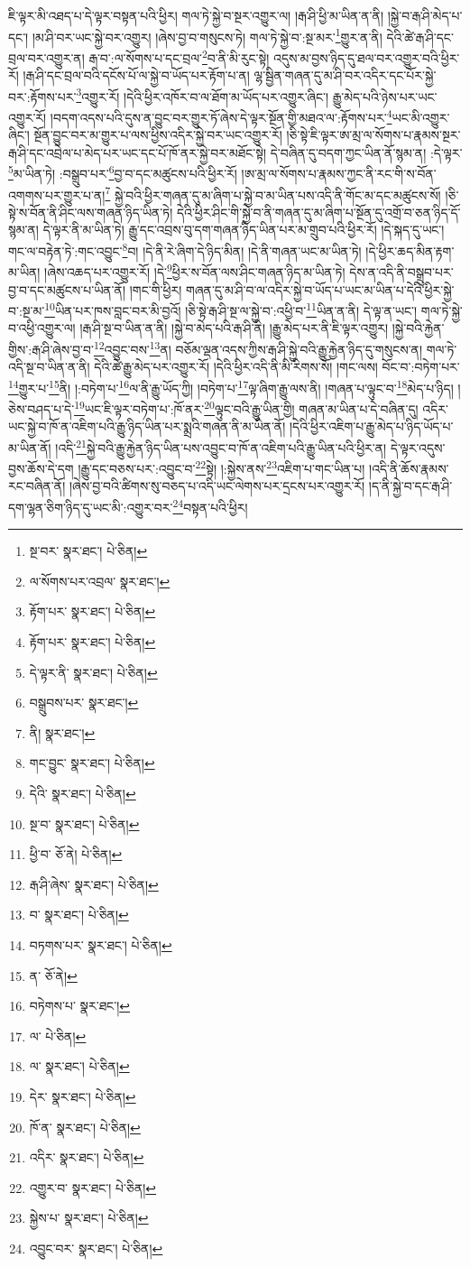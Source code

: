 ཇི་ལྟར་མི་འཐད་པ་དེ་ལྟར་བསྟན་པའི་ཕྱིར། གལ་ཏེ་སྐྱེ་བ་སྔར་འགྱུར་ལ། །རྒ་ཤི་ཕྱི་མ་ཡིན་ན་ནི། །སྐྱེ་བ་རྒ་ཤི་མེད་པ་དང་། །མ་ཤི་བར་ཡང་སྐྱེ་བར་འགྱུར། །ཞེས་བྱ་བ་གསུངས་ཏེ། གལ་ཏེ་སྐྱེ་བ་:སྔ་མར་\footnote{སྔ་བར་  སྣར་ཐང་།  པེ་ཅིན། }གྱུར་ན་ནི། དེའི་ཚེ་རྒ་ཤི་དང་བྲལ་བར་འགྱུར་ན། རྒ་བ་:ལ་སོགས་པ་དང་བྲལ་\footnote{ལ་སོགས་པར་འབྲལ་  སྣར་ཐང་། }བ་ནི་མི་རུང་སྟེ། འདུས་མ་བྱས་ཉིད་དུ་ཐལ་བར་འགྱུར་བའི་ཕྱིར་རོ། །རྒ་ཤི་དང་བྲལ་བའི་དངོས་པོ་ལ་སྐྱེ་བ་ཡོད་པར་རྟོག་པ་ན། ལྷ་སྦྱིན་གཞན་དུ་མ་ཤི་བར་འདིར་དང་པོར་སྐྱེ་བར་:རྟོགས་པར་\footnote{རྟོག་པར་  སྣར་ཐང་།  པེ་ཅིན། }འགྱུར་རོ། །དེའི་ཕྱིར་འཁོར་བ་ལ་ཐོག་མ་ཡོད་པར་འགྱུར་ཞིང་། རྒྱུ་མེད་པའི་ཉེས་པར་ཡང་འགྱུར་རོ། །བདག་འདས་པའི་དུས་ན་བྱུང་བར་གྱུར་ཏོ་ཞེས་དེ་ལྟར་སྔོན་གྱི་མཐའ་ལ་:རྟོགས་པར་\footnote{རྟོག་པར་  སྣར་ཐང་།  པེ་ཅིན། }ཡང་མི་འགྱུར་ཞིང་། སྔོན་བྱུང་བར་མ་གྱུར་པ་ལས་ཕྱིས་འདིར་སྐྱེ་བར་ཡང་འགྱུར་རོ། །ཅི་སྟེ་ཇི་ལྟར་ཨ་མྲ་ལ་སོགས་པ་རྣམས་སྔར་རྒ་ཤི་དང་འབྲེལ་པ་མེད་པར་ཡང་དང་པོ་ཁོ་ནར་སྐྱེ་བར་མཐོང་སྟེ། དེ་བཞིན་དུ་བདག་ཀྱང་ཡིན་ནོ་སྙམ་ན། :དེ་ལྟར་\footnote{དེ་ལྟར་ནི་  སྣར་ཐང་།  པེ་ཅིན། }མ་ཡིན་ཏེ། :བསྒྲུབ་པར་\footnote{བསྒྲུབས་པར་  སྣར་ཐང་། }བྱ་བ་དང་མཚུངས་པའི་ཕྱིར་རོ། །ཨ་མྲ་ལ་སོགས་པ་རྣམས་ཀྱང་ནི་རང་གི་ས་བོན་འགགས་པར་གྱུར་པ་ན།\footnote{ནི།  སྣར་ཐང་། } སྐྱེ་བའི་ཕྱིར་གཞན་དུ་མ་ཞིག་པ་སྐྱེ་བ་མ་ཡིན་པས་འདི་ནི་གོང་མ་དང་མཚུངས་སོ། །ཅི་སྟེ་ས་བོན་ནི་ཤིང་ལས་གཞན་ཉིད་ཡིན་ཏེ། དེའི་ཕྱིར་ཤིང་གི་སྐྱེ་བ་ནི་གཞན་དུ་མ་ཞིག་པ་སྔོན་དུ་འགྲོ་བ་ཅན་ཉིད་དོ་སྙམ་ན། དེ་ལྟར་ནི་མ་ཡིན་ཏེ། རྒྱུ་དང་འབྲས་བུ་དག་གཞན་ཉིད་ཡིན་པར་མ་གྲུབ་པའི་ཕྱིར་རོ། །དེ་སྐད་དུ་ཡང་། གང་ལ་བརྟེན་ཏེ་:གང་འབྱུང་\footnote{གང་བྱུང་  སྣར་ཐང་།  པེ་ཅིན། }བ། །དེ་ནི་རེ་ཞིག་དེ་ཉིད་མིན། །དེ་ནི་གཞན་ཡང་མ་ཡིན་ཏེ། །དེ་ཕྱིར་ཆད་མིན་རྟག་མ་ཡིན། །ཞེས་འཆད་པར་འགྱུར་རོ། །དེ་\footnote{དེའི་  སྣར་ཐང་།  པེ་ཅིན། }ཕྱིར་ས་བོན་ལས་ཤིང་གཞན་ཉིད་མ་ཡིན་ཏེ། དེས་ན་འདི་ནི་བསྒྲུབ་པར་བྱ་བ་དང་མཚུངས་པ་ཡིན་ནོ། །གང་གི་ཕྱིར། གཞན་དུ་མ་ཤི་བ་ལ་འདིར་སྐྱེ་བ་ཡོད་པ་ཡང་མ་ཡིན་པ་དེའི་ཕྱིར་སྐྱེ་བ་:སྔ་མ་\footnote{སྔ་བ་  སྣར་ཐང་།  པེ་ཅིན། }ཡིན་པར་ཁས་བླང་བར་མི་བྱའོ། །ཅི་སྟེ་རྒ་ཤི་སྔ་ལ་སྐྱེ་བ་:འཕྱི་བ་\footnote{ཕྱི་བ་  ཅོ་ནེ།  པེ་ཅིན། }ཡིན་ན་ནི། དེ་ལྟ་ན་ཡང་། གལ་ཏེ་སྐྱེ་བ་འཕྱི་འགྱུར་ལ། །རྒ་ཤི་སྔ་བ་ཡིན་ན་ནི། །སྐྱེ་བ་མེད་པའི་རྒ་ཤི་ནི། །རྒྱུ་མེད་པར་ནི་ཇི་ལྟར་འགྱུར། །སྐྱེ་བའི་རྐྱེན་གྱིས་:རྒ་ཤི་ཞེས་བྱ་བ་\footnote{རྒ་ཤི་ཞེས་  སྣར་ཐང་།  པེ་ཅིན། }འབྱུང་བས་\footnote{བ་  སྣར་ཐང་།  པེ་ཅིན། }ན། བཅོམ་ལྡན་འདས་ཀྱིས་རྒ་ཤི་སྐྱེ་བའི་རྒྱུ་རྐྱེན་ཉིད་དུ་གསུངས་ན། གལ་ཏེ་འདི་སྔ་བ་ཡིན་ན་ནི། དེའི་ཚེ་རྒྱུ་མེད་པར་འགྱུར་རོ། །དེའི་ཕྱིར་འདི་ནི་མི་རིགས་སོ། །གང་ལས། བོང་བ་:བཏེག་པར་\footnote{བཏགས་པར་  སྣར་ཐང་།  པེ་ཅིན། }གྱུར་པ་\footnote{ན་  ཅོ་ནེ། }ནི། །:བཏེག་པ་\footnote{བཏེགས་པ་  སྣར་ཐང་། }ལ་ནི་རྒྱུ་ཡོད་ཀྱི། །བཏེག་པ་\footnote{ལ་  པེ་ཅིན། }ལྟ་ཞིག་རྒྱུ་ལས་ནི། །གཞན་པ་ལྟུང་བ་\footnote{ལ་  སྣར་ཐང་།  པེ་ཅིན། }མེད་པ་ཉིད། །ཅེས་བཤད་པ་དེ་\footnote{དེར་  སྣར་ཐང་།  པེ་ཅིན། }ཡང་ཇི་ལྟར་བཏེག་པ་:ཁོ་ནར་\footnote{ཁོ་ན་  སྣར་ཐང་།  པེ་ཅིན། }ལྟུང་བའི་རྒྱུ་ཡིན་གྱི། གཞན་མ་ཡིན་པ་དེ་བཞིན་དུ། འདིར་ཡང་སྐྱེ་བ་ཁོ་ན་འཇིག་པའི་རྒྱུ་ཉིད་ཡིན་པར་སྨྲའི་གཞན་ནི་མ་ཡིན་ནོ། །དེའི་ཕྱིར་འཇིག་པ་རྒྱུ་མེད་པ་ཉིད་ཡོད་པ་མ་ཡིན་ནོ། །འདི་\footnote{འདིར་  སྣར་ཐང་།  པེ་ཅིན། }སྐྱེ་བའི་རྒྱུ་རྐྱེན་ཉིད་ཡིན་པས་འབྱུང་བ་ཁོ་ན་འཇིག་པའི་རྒྱུ་ཡིན་པའི་ཕྱིར་ན། དེ་ལྟར་འདུས་བྱས་ཆོས་དེ་དག །རྒྱུ་དང་བཅས་པར་:འབྱུང་བ་\footnote{འགྱུར་བ་  སྣར་ཐང་།  པེ་ཅིན། }སྟེ། །:སྐྱེས་ནས་\footnote{སྐྱེས་པ་  སྣར་ཐང་།  པེ་ཅིན། }འཇིག་པ་གང་ཡིན་པ། །འདི་ནི་ཆོས་རྣམས་རང་བཞིན་ནོ། །ཞེས་བྱ་བའི་ཚིགས་སུ་བཅད་པ་འདི་ཡང་ལེགས་པར་དྲངས་པར་འགྱུར་རོ། །ད་ནི་སྐྱེ་བ་དང་རྒ་ཤི་དག་ལྷན་ཅིག་ཉིད་དུ་ཡང་མི་:འགྱུར་བར་\footnote{འབྱུང་བར་  སྣར་ཐང་།  པེ་ཅིན། }བསྟན་པའི་ཕྱིར། 